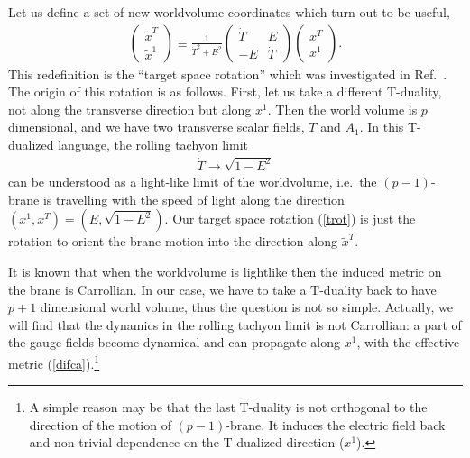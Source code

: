 \documentclass[a4paper,12pt]{article}
\begin{document}
Let us define a set of 
new worldvolume coordinates which turn out to be useful,  
\begin{eqnarray}
 \left(
\begin{array}{c}
\widetilde{x}^T \\
\widetilde{x}^1
\end{array}\right)
\equiv 
\frac{1}{\dot{T}^2 + E^2}
\left(
\begin{array}{cc}
\dot{T} & E 
\\ -E & \dot{T}
\end{array}
\right)
 \left(
\begin{array}{c}
x^T \\
x^1
\end{array}\right).
\label{trot}
\end{eqnarray}
This redefinition is the ``target space rotation'' which was
investigated in Ref.\ \cite{Hashimoto}. The origin of this rotation is
as follows. First, let us take a different T-duality, not along the
transverse direction but along $x^1$. Then the world volume is $p$
dimensional, and we have two transverse scalar fields, $T$ and $A_1$. 
In this T-dualized  language, the rolling tachyon limit 
\begin{eqnarray}
 \dot{T} \rightarrow \sqrt{1-E^2}
\end{eqnarray}
can be understood as a light-like limit of the worldvolume, i.e.\ the 
$(p\!-\!1)$-brane is travelling with the speed of light along the
direction  
$(x^1, x^T)= (E, \sqrt{1-E^2})$. Our target space rotation 
(\ref{trot}) is just the rotation to orient the brane motion into the
direction along $\widetilde{x}^T$.

It is known that when the
worldvolume is lightlike then the induced metric on the brane is
Carrollian. 
In our case, we have to take a T-duality back to have $p+1$
dimensional world volume, thus the question is not so simple. Actually,
we will find that the dynamics in the rolling tachyon limit is not
Carrollian: a part of the gauge fields become dynamical and
can propagate along $x^1$, with the effective metric 
(\ref{difca}).\footnote{A simple reason may be that 
the last T-duality is not orthogonal to the direction of the
motion of $(p\!-\!1)$-brane. It induces the electric field back 
\cite{Bachas} and
non-trivial dependence on the T-dualized direction ($x^1$). }
\end{document}
